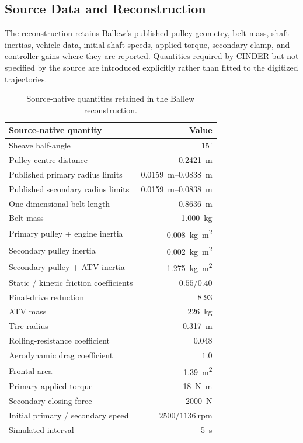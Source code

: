 \documentclass[11pt]{report}
\numberwithin{equation}{section}
\begin{document}
\subsection{Source Data and Reconstruction}
\label{app:ballew_reconstruction}

The reconstruction retains Ballew's published pulley geometry, belt mass,
shaft inertias, vehicle data, initial shaft speeds, applied torque, secondary
clamp, and controller gains where they are reported. Quantities required by
CINDER but not specified by the source are introduced explicitly rather than
fitted to the digitized trajectories.

\begin{table}[H]
\centering
\small
\begin{tabular}{@{}p{}r@{}}
\toprule
Source-native quantity & Value \\
\midrule
Sheave half-angle & \(15^\circ\) \\
Pulley centre distance & \SI{0.2421}{\meter} \\
Published primary radius limits & \SIrange{0.0159}{0.0838}{\meter} \\
Published secondary radius limits & \SIrange{0.0159}{0.0838}{\meter} \\
One-dimensional belt length & \SI{0.8636}{\meter} \\
Belt mass & \SI{1.000}{\kilogram} \\
Primary pulley + engine inertia & \SI{0.008}{\kilogram\meter\squared} \\
Secondary pulley inertia & \SI{0.002}{\kilogram\meter\squared} \\
Secondary pulley + ATV inertia & \SI{1.275}{\kilogram\meter\squared} \\
Static / kinetic friction coefficients & \(0.55 / 0.40\) \\
Final-drive reduction & \(8.93\) \\
ATV mass & \SI{226}{\kilogram} \\
Tire radius & \SI{0.317}{\meter} \\
Rolling-resistance coefficient & \(0.048\) \\
Aerodynamic drag coefficient & \(1.0\) \\
Frontal area & \SI{1.39}{\meter\squared} \\
Primary applied torque & \SI{18}{\newton\meter} \\
Secondary closing force & \SI{2000}{\newton} \\
Initial primary / secondary speed & \(2500 / 1136~\mathrm{rpm}\) \\
Simulated interval & \SI{5}{\second} \\
\bottomrule
\end{tabular}
\caption{Source-native quantities retained in the Ballew reconstruction.}
\label{tab:ballew_source_quantities}
\end{table}
\end{document}

